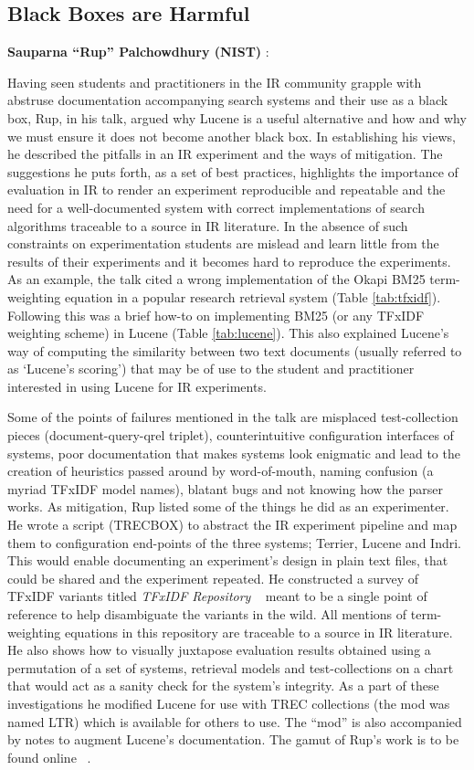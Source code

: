 \subsection*{Black Boxes are Harmful}
{\bf Sauparna ``Rup'' Palchowdhury (NIST) }:

Having seen students and practitioners in the IR community grapple
with abstruse documentation accompanying search systems and their use
as a black box, Rup, in his talk, argued why Lucene is a useful
alternative and how and why we must ensure it does not become another
black box. In establishing his views, he described the pitfalls in an
IR experiment and the ways of mitigation. The suggestions he puts
forth, as a set of best practices, highlights the importance of
evaluation in IR to render an experiment reproducible and repeatable
and the need for a well-documented system with correct implementations
of search algorithms traceable to a source in IR literature. In the
absence of such constraints on experimentation students are mislead
and learn little from the results of their experiments and it becomes
hard to reproduce the experiments. As an example, the talk cited a
wrong implementation of the Okapi BM25 term-weighting equation in a popular research retrieval system (Table \ref{tab:tfxidf}). Following this was
a brief how-to on implementing BM25 (or any TFxIDF weighting scheme)
in Lucene (Table \ref{tab:lucene}). This also explained Lucene's way
of computing the similarity between two text documents (usually
referred to as `Lucene's scoring') that may be of use to the student
and practitioner interested in using Lucene for IR experiments.

Some of the points of failures mentioned in the talk are misplaced
test-collection pieces (document-query-qrel triplet), counterintuitive
configuration interfaces of systems, poor documentation that makes
systems look enigmatic and lead to the creation of heuristics passed
around by word-of-mouth, naming confusion (a myriad TFxIDF model
names), blatant bugs and not knowing how the parser works. As
mitigation, Rup listed some of the things he did as an
experimenter. He wrote a script (TRECBOX) to abstract the IR
experiment pipeline and map them to configuration end-points of the
three systems; Terrier, Lucene and Indri. This would enable
documenting an experiment's design in plain text files, that could be
shared and the experiment repeated. He constructed a survey of TFxIDF
variants titled \emph{TFxIDF Repository} ~\cite{rup:TFXIDFRepository}
meant to be a single point of reference to help disambiguate the
variants in the wild. All mentions of term-weighting equations in this
repository are traceable to a source in IR literature. He also shows
how to visually juxtapose evaluation results obtained using a
permutation of a set of systems, retrieval models and test-collections
on a chart that would act as a sanity check for the system's
integrity. As a part of these investigations he modified Lucene for
use with TREC collections (the mod was named LTR) which is available
for others to use. The ``mod'' is also accompanied by notes to augment
Lucene's documentation. The gamut of Rup's work is to be found online
~\cite{rup:IR}.


